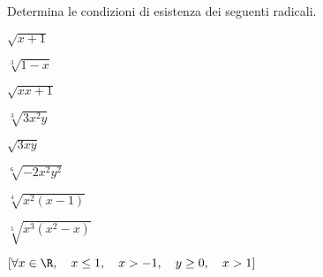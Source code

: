 
\subsubsection*{}

\begin{esercizio}
\label{ese:2.11}
Determina le condizioni di esistenza dei seguenti radicali.
\begin{htmulticols}{4}
\begin{enumeratea}
\item \(\sqrt{x+1}\)
\item \(\sqrt[3]{1-x}\)
\item \(\sqrt{x{x+1}}\)
\item \(\sqrt[3]{3x^2y}\)
\item \(\sqrt{3xy}\)
\item \(\sqrt[6]{-2x^2y^2}\)
\item \(\sqrt[4]{x^2(x-1)}\)
\item \(\sqrt[5]{x^3(x^2-x)}\)
\end{enumeratea}
\end{htmulticols}
\begin{flushright}
\vspace*{-8pt}
\([\forall x\in \R,\quad x\le 1,\quad x>-1,\quad y\ge 0,\quad x>1]\)
\end{flushright}
\end{esercizio}


